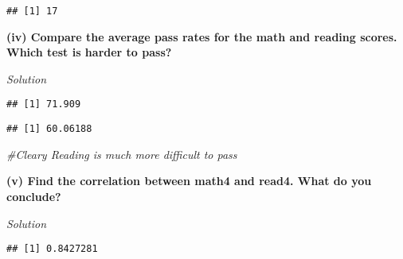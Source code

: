 \documentclass[
]{article}
\newenvironment{Shaded}{\begin{snugshade}}{\end{snugshade}}
\newcommand{\CommentTok}[1]{\textcolor[rgb]{0.56,0.35,0.01}{\textit{#1}}}
\newcommand{\KeywordTok}[1]{\textcolor[rgb]{0.13,0.29,0.53}{\textbf{#1}}}
\newcommand{\NormalTok}[1]{#1}
\newcommand{\OperatorTok}[1]{\textcolor[rgb]{0.81,0.36,0.00}{\textbf{#1}}}
\begin{document}
\begin{verbatim}
## [1] 17
\end{verbatim}

\textbf{(iv) Compare the average pass rates for the math and reading
scores. Which test is harder to pass? }

\emph{Solution}

\begin{Shaded}
\end{Shaded}

\begin{verbatim}
## [1] 71.909
\end{verbatim}

\begin{Shaded}
\end{Shaded}

\begin{verbatim}
## [1] 60.06188
\end{verbatim}

\begin{Shaded}
\begin{Highlighting}[]
\CommentTok{#Cleary Reading is much more difficult to pass}
\end{Highlighting}
\end{Shaded}

\textbf{(v) Find the correlation between math4 and read4. What do you
conclude? }

\emph{Solution}

\begin{Shaded}
\end{Shaded}

\begin{verbatim}
## [1] 0.8427281
\end{verbatim}
\end{document}
